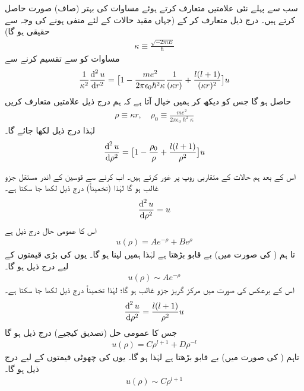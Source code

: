  سب سے پہلے نئی علامتیں متعارف کرتے ہوئے مساوات کی بہتر (صاف) صورت حاصل کرتے ہیں۔ درج ذیل متعارف کر کے (جہاں مقید حالات کے لئے  منفی ہونے کی وجہ سے   حقیقی ہو گا)
 \begin{align}\label{مساوات_ابعادی_متعارف_الف}
\kappa \equiv \frac{\sqrt{-2mE}}{\hslash} 
\end{align}
 مساوات  کو  سے تقسیم کرنے سے
\begin{align*}
\frac{1}{\kappa ^{2}}\frac{\dif^{\,2}{u}}{\dif{r^{2}}}=\big[1-\frac{me^{2}}{2\pi\epsilon_{0}\hslash^{2}\kappa }\frac{1}{(\kappa r)}+\frac{l(l+1)}{(\kappa r)^{2}}\big]u 
\end{align*}
حاصل ہو گا جس کو دیکھ کر ہمیں خیال آتا ہے کہ ہم درج ذیل علامتیں متعارف کریں 
\begin{align}\label{مساوات_ابعادی_متعارف_ب}
\rho\equiv \kappa r, \quad \rho_{0}\equiv\frac{me^{2}}{2\pi\epsilon_{0}\hslash^{2}\kappa } 
\end{align}
لہٰذا درج ذیل لکھا جائے گا۔
\begin{align}\label{مساوات_ابعادی_رداسی_کولمب_نئے_متغیرات}
\frac{\dif^{\,2}{u}}{\dif{\rho^{2}}}=\big[1-\frac{\rho_{0}}{\rho}+\frac{l(l+1)}{\rho^{2}}\big]u 
\end{align}

اس کے بعد ہم حالات کے  متقاربی روپ پر غور کرتے ہیں۔ اب  کرنے سے قوسین کے اندر مستقل جزو غالب ہو گا لہٰذا (تخمیناً) درج ذیل لکھا جا سکتا ہے۔
\begin{align*}
\frac{\dif^{\,2}{u}}{\dif{\rho^{2}}}=u 
\end{align*}
اس کا عمومی حال درج ذیل ہے
\begin{align}\label{مساوات_ابعاد_عمومی_حل_بے_قابو}
u(\rho)=Ae^{-\rho}+Be^{\rho} 
\end{align}
تا ہم  ( کی صورت میں)  بے قابو بڑھتا ہے لہٰذا ہمیں  لینا ہو گا۔ یوں  کی بڑی قیمتوں کے لیے درج  ذیل ہو گا۔
\begin{align}
u(\rho)\sim Ae^{-\rho} 
\end{align}
اس کے برعکس  کی صورت میں مرکز گریز جزو غالب ہو گا؛ لہٰذا تخمیناً  درج ذیل لکھا جا سکتا ہے۔ 
\begin{align*}
\frac{\dif^{\,2}{u}}{\dif{\rho^{2}}}=\frac{l(l+1)}{\rho^{2}}u 
\end{align*}
 جس کا عمومی حل (تصدیق کیجیے) درج ذیل ہو گا
 \begin{align*}
u(\rho)=C\rho^{l+1}+D\rho^{-l} 
\end{align*}
 تاہم  (  کی صورت میں)    بے قابو بڑھتا ہے لہٰذا   ہو گا۔ یوں    کی چھوٹی قیمتوں کے لیے درج ذیل ہو گا۔
 \begin{align}\label{مساوات_ابعادی_ہائیڈروجن_مبدا_قریب}
u(\rho)\sim C\rho^{l+1} 
\end{align}

